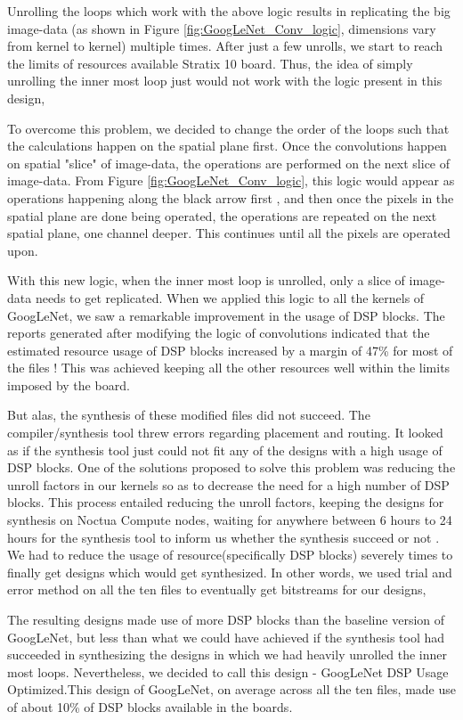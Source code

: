Unrolling the loops which work with the above logic results in replicating the big image-data (as shown in Figure \ref{fig:GoogLeNet_Conv_logic}, dimensions vary from kernel to kernel) multiple times. After just a few unrolls, we start to reach the limits of resources available Stratix 10 board. Thus, the idea of simply unrolling the inner most loop just would not work with the logic present in this design,

To overcome this problem, we decided to change the order of the loops such that the calculations happen on the spatial plane first. Once the convolutions happen on spatial "slice" of image-data, the operations are performed on the next slice of image-data. From Figure \ref{fig:GoogLeNet_Conv_logic}, this logic would appear as operations happening along the black arrow first , and then once the pixels in the spatial plane are done being operated, the operations are repeated on the next spatial plane, one channel deeper. This continues until all the pixels are operated upon.  

With this new logic, when the inner most loop is unrolled, only a slice of image-data needs to get replicated. When we applied this logic to all the kernels of GoogLeNet, we saw a remarkable improvement in the usage of DSP blocks. The reports generated after modifying the logic of convolutions indicated that the estimated resource usage of DSP blocks increased by a margin of 47\% for most of the files ! This was achieved keeping all the other resources well within the limits imposed by the board. 

But alas, the synthesis of these modified files did not succeed. The compiler/synthesis tool threw errors regarding placement and routing. It looked as if the synthesis tool just could not fit any of the designs with a high usage of DSP blocks.   
One of the solutions proposed to solve this problem was reducing the unroll factors in our kernels so as to decrease the need for a high number of DSP blocks. This process entailed reducing the unroll factors, keeping the designs for synthesis on Noctua Compute nodes, waiting for anywhere between 6 hours to 24 hours for the synthesis tool to inform us whether the synthesis succeed or not . We had to reduce the usage of resource(specifically DSP blocks) severely times to finally get designs  which would get synthesized. In other words, we used trial and error method on all the ten files to eventually get bitstreams for our designs,  

The resulting designs made use of more DSP blocks than the baseline version of GoogLeNet, but less than what we could have achieved if the synthesis tool had succeeded in synthesizing the designs in which we had heavily unrolled the inner most loops. Nevertheless, we decided to call this design - GoogLeNet DSP Usage Optimized.This design of GoogLeNet, on average across all the ten files, made use of about 10\% of DSP blocks available in the boards.

